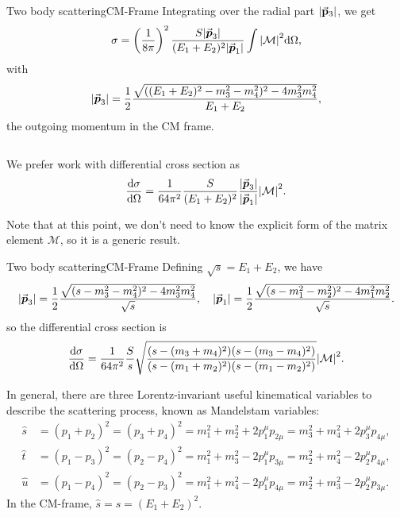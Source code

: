 \documentclass{../bredelebeamer}
\begin{document}
\begin{frame}{Two body scattering}{CM-Frame}
    Integrating over the radial part $\abs{\va p_3}$, we get
    \begin{equation}
        \sigma = \left(\frac{1}{8\pi}\right)^2 \frac{S |\va*{p}_3|}{(E_1 +E_2)^2 \abs{\va*{p}_1}} \int \abs{\mathcal{M}}^2 \dd\Omega,
    \end{equation}
    with
    \begin{equation}
        |\va*{p}_3| = \frac{1}{2} \frac{\sqrt{((E_1+E_2)^2 - m_3^2 -m_4^2)^2- 4m^2_3m^2_4} }{E_1+E_2},
    \end{equation}
    the outgoing momentum in the CM frame.

    $$ $$

    We prefer work with differential cross section as
    \begin{equation}
        \frac{\dd \sigma}{\dd \Omega} = \frac{1}{64\pi^2} \frac{S }{(E_1 +E_2)^2 } \frac{|\va*{p}_3|}{\abs{\va*{p}_1}} \abs{\mathcal{M}}^2.
    \end{equation}


    Note that at this point, we don't need to know the explicit form of the matrix element $\mathcal{M}$, so it is a generic result.
\end{frame}

\begin{frame}{Two body scattering}{CM-Frame}
    Defining $\sqrt s = E_1 + E_2$, we have
    \begin{equation}
        |\va*{p}_3| = \frac{1}{2} \frac{\sqrt{(s - m_3^2 -m_4^2)^2- 4m^2_3m^2_4} }{\sqrt s}, \quad  |\va*{p}_1|=\frac{1}{2} \frac{\sqrt{(s - m_1^2 -m_2^2)^2- 4m^2_1m^2_2} }{\sqrt s}.
    \end{equation}
    so the differential cross section is
    \begin{equation}
        \frac{\dd \sigma}{\dd \Omega} = \frac{1}{64\pi^2} \frac{S }{s }
        \sqrt{\frac{(s - (m_3 + m_4)^2)(s - (m_3 - m_4)^2)}{(s - (m_1 + m_2)^2)(s - (m_1 - m_2)^2)}}
        \abs{\mathcal{M}}^2.
    \end{equation}

    In general, there are three Lorentz-invariant useful kinematical variables to describe the scattering process, known as Mandelstam variables:
    \begin{align}
        \hat s & = (p_1 + p_2)^2 = (p_3 + p_4)^2 = m_1^2 + m_2^2 + 2p_1^\mu p_{2\mu }= m_3^2 + m_4^2 + 2p_3^\mu p_{4\mu}, \\
        \hat t & = (p_1 - p_3)^2 = (p_2 - p_4)^2= m_1^2 + m_3^2 - 2p_1^\mu p_{3\mu }= m_2^2 + m_4^2 - 2p_2^\mu p_{4\mu},  \\
        \hat u & = (p_1 - p_4)^2 = (p_2 - p_3)^2= m_1^2 + m_4^2 - 2p_1^\mu p_{4\mu }= m_2^2 + m_3^2 - 2p_2^\mu p_{3\mu}.
    \end{align}
    In the CM-frame, $\hat s = s = (E_1+E_2)^2$.
\end{frame}
\end{document}
